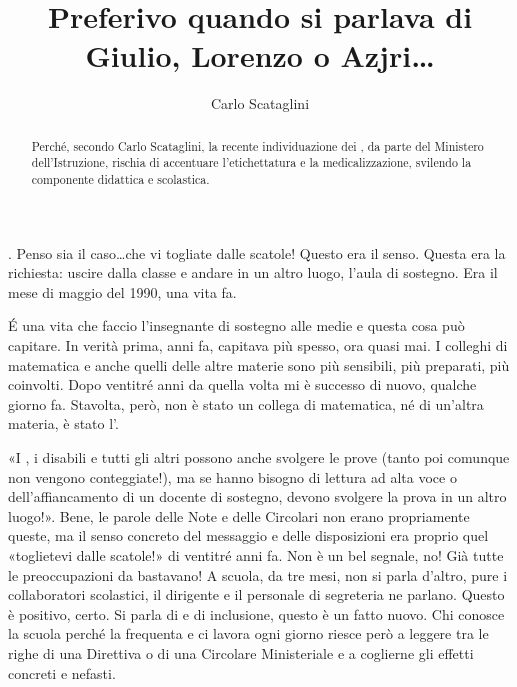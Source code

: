 \author{Carlo Scataglini}
\title{Preferivo quando si parlava di Giulio, Lorenzo o Azjri…}
\label{cha:scataglini1}
\begin{abstract}
Perché, secondo Carlo Scataglini, la recente individuazione dei , da parte del Ministero dell'Istruzione, rischia di accentuare l'etichettatura e la medicalizzazione, svilendo la componente didattica e scolastica. 
\end{abstract}
\maketitle
{}. Penso sia il caso\dots che vi togliate dalle scatole! Questo era il senso. Questa era la richiesta: uscire dalla classe e andare in un altro luogo, l'aula di sostegno. Era il mese di maggio del 1990, una vita fa.

\'E una vita che faccio l'insegnante di sostegno alle medie e questa cosa può capitare. In verità prima, anni fa, capitava più spesso, ora quasi mai. I colleghi di matematica e anche quelli delle altre materie sono più sensibili, più preparati, più coinvolti. Dopo ventitré anni da quella volta mi è successo di nuovo, qualche giorno fa. Stavolta, però, non è stato un collega di matematica, né di un'altra materia, è stato l'.

«I , i disabili e tutti gli altri   possono anche svolgere le prove (tanto poi comunque non vengono conteggiate!), ma se hanno bisogno di lettura ad alta voce o dell'affiancamento di un docente di sostegno, devono svolgere la prova in un altro luogo!». Bene, le parole delle Note e delle Circolari  non erano propriamente queste, ma il senso concreto del messaggio e delle disposizioni era proprio quel «toglietevi dalle scatole!» di ventitré anni fa. Non è un bel segnale, no!
Già tutte le preoccupazioni da  bastavano! A scuola, da tre mesi, non si parla d'altro, pure i collaboratori scolastici, il dirigente e il personale di segreteria ne parlano. Questo è positivo, certo. Si parla di  e di inclusione, questo è un fatto nuovo. Chi conosce la scuola perché la frequenta e ci lavora ogni giorno riesce però a leggere tra le righe di una Direttiva o di una Circolare Ministeriale e a coglierne gli effetti concreti e nefasti.

